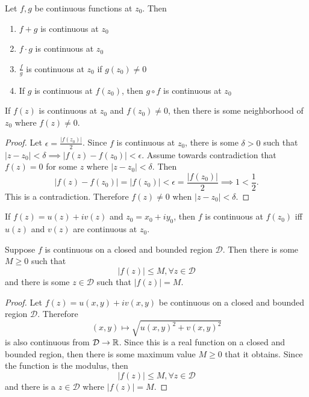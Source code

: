 \documentclass[../notes.tex]{subfiles}
\begin{document}
\begin{theorem}
    \label{thm:continuityresults}
    Let $f, g$ be continuous functions at $z_0$. Then
    \begin{enumerate}
        \item $f+g$ is continuous at $z_0$
        \item $f\cdot g$ is continuous at $z_0$
        \item $\frac{f}{g}$ is continuous at $z_0$ if $g(z_0) \neq 0$
        \item If $g$ is continuous at $f(z_0)$, then $g\circ f$ is continuous at $z_0$
    \end{enumerate}
\end{theorem}

\begin{theorem}
    If $f(z)$ is continuous at $z_0$ and $f(z_0) \neq 0$, then there is some neighborhood of $z_0$ where $f(z) \neq 0$.
\end{theorem}

\begin{proof}
    Let $\epsilon = \frac{|f(z_0)|}{2}$. Since $f$ is continuous at $z_0$, there is some $\delta > 0$ such that $|z - z_0| < \delta \implies |f(z) - f(z_0)| < \epsilon$. Assume towards contradiction that $f(z) = 0$ for some $z$ where $|z - z_0| < \delta$. Then
    \[
        |f(z) - f(z_0)| = |f(z_0)| < \epsilon = \frac{|f(z_0)|}{2} \implies 1 < \frac{1}{2}
    .\]
    This is a contradiction. Therefore $f(z) \neq 0$ when $|z-z_0| < \delta$. 
\end{proof}

\begin{theorem}
    If $f(z) = u(z) + iv(z)$ and $z_0 = x_0 + i y_0$, then $f$ is continuous at $f(z_0)$ iff $u(z)$ and $v(z)$ are continuous at $z_0$.
\end{theorem}

\begin{theorem}
    Suppose $f$ is continuous on a closed and bounded region $\mathcal{D}$. Then there is some $M \geq 0$ such that
    \[
        |f(z)| \leq M, \forall z \in \mathcal{D}
    \]
    and there is some $z \in \mathcal{D}$ such that $|f(z)| = M$.
\end{theorem}
\begin{proof}
    Let $f(z) = u(x,y) + i v(x,y)$ be continuous on a closed and bounded region $\mathcal{D}$. Therefore
    \[
        (x, y) \mapsto \sqrt{u(x,y)^2 + v(x,y)^2}
    \]
    is also continuous from $\mathcal{D} \to \mathbb{R}$. Since this is a real function on a closed and bounded region, then there is some maximum value $M \geq 0$ that it obtains. Since the function is the modulus, then
    \[
        |f(z)| \leq M, \forall z \in \mathcal{D}
    \]
    and there is a $z \in \mathcal{D}$ where $|f(z)| = M$.
\end{proof}
\end{document}
